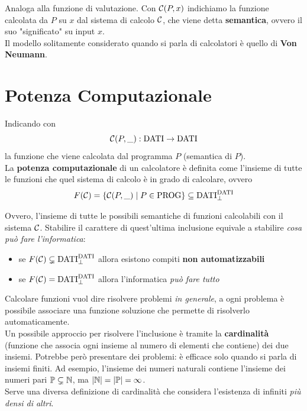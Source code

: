 Analoga alla funzione di valutazione. Con $\mathcal{C}(P,x)$ indichiamo la funzione calcolata da $P$ su $x$ dal sistema di calcolo $\mathcal{C}$, che viene detta \textbf{semantica}, ovvero il suo "significato" su input $x$.\\

Il modello solitamente considerato quando si parla di calcolatori è quello di \textbf{Von Neumann}.\\

\section{Potenza Computazionale}
Indicando con 
$$ \mathcal{C} (P, \_): \text{DATI} \rightarrow \text{DATI} $$
la funzione che viene calcolata dal programma $P$ (semantica di $P$).\\

La \textbf{potenza computazionale} di un calcolatore è definita come l'insieme di tutte le funzioni che quel sistema di calcolo è in grado di calcolare, ovvero
$$ F(\mathcal{C}) = \{\mathcal{C} (P, \_) \mid P \in \text{PROG}\} \subseteq \text{DATI}_\bot^{\text{DATI}} $$

Ovvero, l'insieme di tutte le possibili semantiche di funzioni calcolabili con il sistema $\mathcal{C}$. Stabilire il carattere di quest'ultima inclusione equivale a stabilire \textit{cosa può fare l'informatica}:
\begin{itemize}
	\item se $F(\mathcal{C}) \subsetneq \text{DATI}_\bot^{\text{DATI}}$ allora esistono compiti \textbf{non automatizzabili}
	\item se $F(\mathcal{C}) = \text{DATI}_\bot^{\text{DATI}}$ allora l'informatica \textit{può fare tutto}
\end{itemize}

Calcolare funzioni vuol dire risolvere problemi \textit{in generale}, a ogni problema è possibile associare una funzione soluzione che permette di risolverlo automaticamente.\\

Un possibile approccio per risolvere l'inclusione è tramite la \textbf{cardinalità} (funzione che associa ogni insieme al numero di elementi che contiene) dei due insiemi. Potrebbe però presentare dei problemi: è efficace solo quando si parla di insiemi finiti. Ad esempio, l'insieme dei numeri naturali contiene l'insieme dei numeri pari $\mathbb{P} \subsetneq \mathbb{N}$, ma $|\mathbb{N}| = |\mathbb{P}| = \infty$.\\
Serve una diversa definizione di cardinalità che considera l'esistenza di infiniti \textit{più densi di altri}.\\

